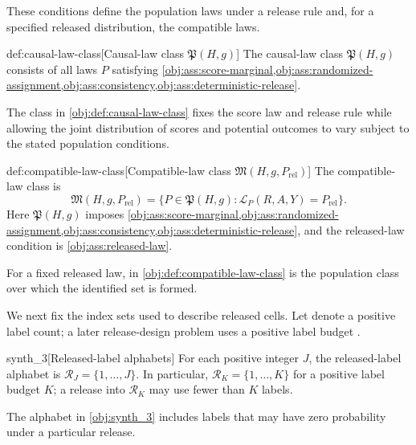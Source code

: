 These conditions define the population laws under a release rule and, for a specified released distribution, the compatible laws.

\begin{definitionv}{def:causal-law-class}[Causal-law class \(\mathfrak P(H,g)\)]
The causal-law class \(\mathfrak P(H,g)\) consists of all laws \(P\) satisfying \cref{obj:ass:score-marginal,obj:ass:randomized-assignment,obj:ass:consistency,obj:ass:deterministic-release}.
\end{definitionv}

The class  in \cref{obj:def:causal-law-class} fixes the score law and release rule while allowing the joint distribution of scores and potential outcomes to vary subject to the stated population conditions.

\begin{definitionv}{def:compatible-law-class}[Compatible-law class \(\mathfrak M(H,g,P_{\mathrm{rel}})\)]
The compatible-law class is
\[
\mathfrak M(H,g,P_{\mathrm{rel}})
=
\bigl\{P\in\mathfrak P(H,g):\mathcal L_P(R,A,Y)=P_{\mathrm{rel}}\bigr\}.
\]
Here \(\mathfrak P(H,g)\) imposes \cref{obj:ass:score-marginal,obj:ass:randomized-assignment,obj:ass:consistency,obj:ass:deterministic-release}, and the released-law condition is \cref{obj:ass:released-law}.
\end{definitionv}

For a fixed released law,  in \cref{obj:def:compatible-law-class} is the population class over which the identified set is formed.

We next fix the index sets used to describe released cells. Let  denote a positive label count; a later release-design problem uses a positive label budget .

\begin{definitionv}{synth_3}[Released-label alphabets]
For each positive integer \(J\), the released-label alphabet is \(\mathcal R_J=\{1,\ldots,J\}\). In particular, \(\mathcal R_K=\{1,\ldots,K\}\) for a positive label budget \(K\); a release into \(\mathcal R_K\) may use fewer than \(K\) labels.
\end{definitionv}

The alphabet  in \cref{obj:synth_3} includes labels that may have zero probability under a particular release.

